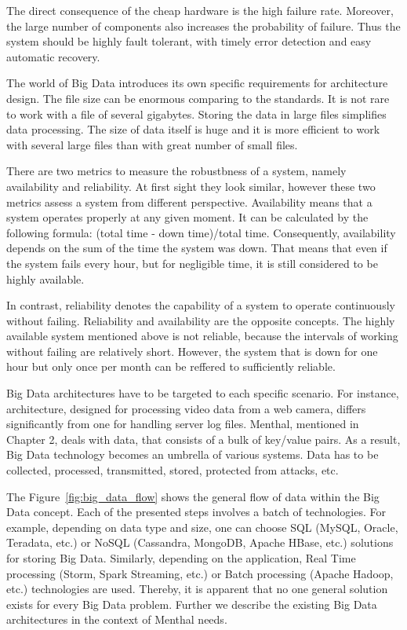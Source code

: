 The direct consequence of the cheap hardware is the high failure rate.
Moreover, the large number of components also increases the probability of failure. 
Thus the system should be highly fault tolerant, with timely error detection and easy automatic recovery.

The world of Big Data introduces its own specific requirements for architecture design.
The file size can be enormous comparing to the standards.
It is not rare to work with a file of several gigabytes.
Storing the data in large files simplifies data processing.
The size of data itself is huge and it is more efficient to work with several large files than with great number of small files.

There are two metrics to measure the robustbness of a system, namely availability and reliability.
At first sight they look similar, however these two metrics assess a system from different perspective.
Availability means that a system operates properly at any given moment.
It can be calculated by the following formula: (total time - down time)/total time.
Consequently, availability depends on the sum of the time the system was down.
That means that even if the system fails every hour, but for negligible time, it is still considered to be highly available.

In contrast, reliability denotes the capability of a system to operate continuously without failing.
Reliability and availability are the opposite concepts.
The highly available system mentioned above is not reliable, because the intervals of working without failing are relatively short.
However, the system that is down for one hour but only once per month can be reffered to sufficiently reliable.

Big Data architectures have to be targeted to each specific scenario.
For instance, architecture, designed for processing video data from a web camera, differs significantly from one for handling server log files.
Menthal, mentioned in Chapter 2, deals with data, that consists of a bulk of key/value pairs. 
As a result, Big Data technology becomes an umbrella of various systems. 
Data has to be collected, processed, transmitted, stored, protected from attacks, etc.

The Figure~\ref{fig:big_data_flow} shows the general flow of data within the Big Data concept.
Each of the presented steps involves a batch of technologies.
For example, depending on data type and size, one can choose SQL (MySQL, Oracle, Teradata, etc.) or NoSQL (Cassandra, MongoDB, Apache HBase, etc.) solutions for storing Big Data.
Similarly, depending on the application, Real Time processing (Storm, Spark Streaming, etc.) or Batch processing (Apache Hadoop, etc.) technologies are used. 
Thereby, it is apparent that no one general solution exists for every Big Data problem.
Further we describe the existing Big Data architectures in the context of Menthal needs.

